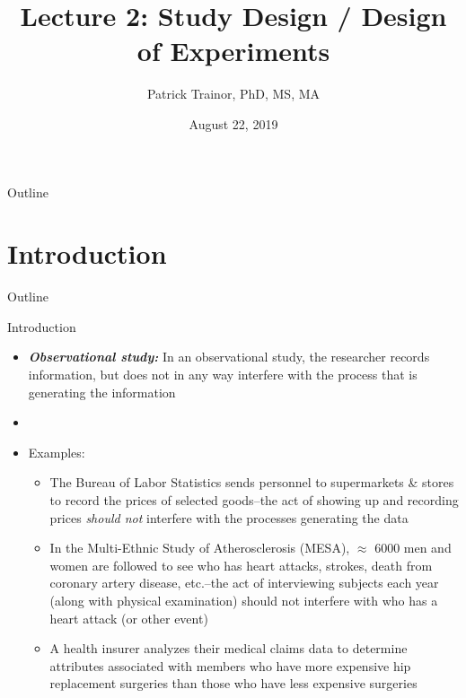 \documentclass[xcolor=dvipsnames]{beamer}
\title[Lecture 2]{Lecture 2: Study Design / Design of Experiments}
\author[Patrick Trainor]{Patrick Trainor, PhD, MS, MA}
\institute[NMSU]{New Mexico State University}
\date{August 22, 2019}
\begin{document}
\begin{frame}
\maketitle
\end{frame}

\begin{frame}{Outline}
\tableofcontents[hideallsubsections]
\end{frame}

\section{Introduction}
\begin{frame}{Outline}
\tableofcontents[currentsection,subsectionstyle=show/shaded/hide]
\end{frame}

\begin{frame}{Introduction}
	\begin{itemize}
		\item \textbf{\emph{Observational study:}} In an observational study, the researcher records information, but does not in any way interfere with the process that is generating the information
		\item[]
		\item Examples:
		\begin{itemize}
			\item The Bureau of Labor Statistics sends personnel to supermarkets \& stores to record the prices of selected goods--the act of showing up and recording prices \emph{should not} interfere with the processes generating the data
			\item In the Multi-Ethnic Study of Atherosclerosis (MESA), $\approx$ 6000 men and women are followed to see who has heart attacks, strokes, death from coronary artery disease, etc.--the act of interviewing subjects each year (along with physical examination) should not interfere with who has a heart attack (or other event)
			\item A health insurer analyzes their medical claims data to determine attributes associated with members who have more expensive hip replacement surgeries than those who have less expensive surgeries
		\end{itemize}
	\end{itemize}
\end{frame}
\end{document}
